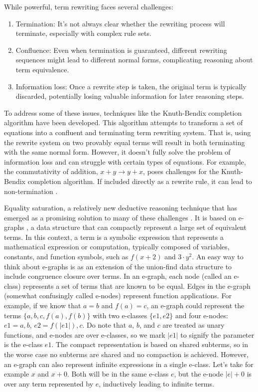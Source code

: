 While powerful, term rewriting faces several challenges:
\begin{enumerate}
    \item Termination: It's not always clear whether the rewriting process will terminate, especially with complex rule sets.
    \item Confluence: Even when termination is guaranteed, different rewriting sequences might lead to different normal forms, complicating reasoning about term equivalence.
    \item Information loss: Once a rewrite step is taken, the original term is typically discarded, potentially losing valuable information for later reasoning steps.
\end{enumerate}

To address some of these issues, techniques like the Knuth-Bendix completion algorithm \cite{knuthbendixcompletion} have been developed. 
This algorithm attempts to transform a set of equations into a confluent and terminating term rewriting system. 
That is, using the rewrite system on two provably equal terms will result in both terminating with the same normal form.
However, it doesn't fully solve the problem of information loss and can struggle with certain types of equations. 
For example, the commutativity of addition, $x + y \rightarrow y + x$, poses challenges for the Knuth-Bendix completion algorithm. 
If included directly as a rewrite rule, it can lead to non-termination \cite{kapur1985knuthintro}.

Equality saturation, a relatively new deductive reasoning technique that has emerged as a promising solution to many of these challenges \cite{eqsat}. 
It is based on e-graphs \cite{egg}, a data structure that can compactly represent a large set of equivalent terms.
In this context, a term is a symbolic expression that represents a mathematical expression or computation, typically composed of variables, constants, and function symbols, such as  $f(x+2)$ and $3 \cdot y^2$.
An easy way to think about e-graphs is as an extension of the union-find data structure to include congruence closure over terms.
In an e-graph, each node (called an e-class) represents a set of terms that are known to be equal.
Edges in the e-graph (somewhat confusingly called e-nodes) represent function applications.
For example, if we know that $a = b$ and $f(a) = c$, an e-graph could represent the terms $\{ a, b, c, f(a), f(b) \}$ with two e-classes $\{ e1, e2 \}$ and four e-nodes: $e1  = {a, b}$, $e2 = {f(|e1|), c}$.
Do note that $a$, $b$, and $c$ are treated as unary functions, and e-nodes are over e-classes, so we mark $|e1|$ to signify the parameter is the e-class $e1$.
The compact representation is based on shared subterms, so in the worse case no subterms are shared and no compaction is achieved.
However, an e-graph can also represent infinite expressions in a single e-class.
Let's take for example $x$ and $x + 0$.
Both will be in the same e-class $e$, but the e-node $|e| + 0$ is over any term represented by $e$, inductively leading to infinite terms.

